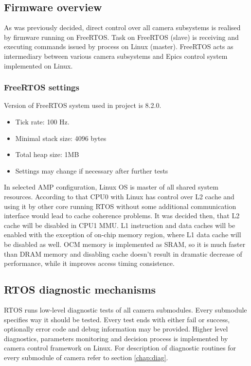 

\subsection{Firmware overview}
As was previously decided, direct control over all camera subsystems is realised by firmware running on FreeRTOS. Task on FreeRTOS (slave) is receiving and executing commands issued by process on Linux (master). FreeRTOS acts as intermediary between various camera subsystems and Epics control system implemented on Linux.

\subsubsection{FreeRTOS settings}
Version of FreeRTOS system used in project is 8.2.0. 

\begin{itemize}
\item Tick rate: 100 Hz.
\item Minimal stack size: 4096 bytes
\item Total heap size: 1MB
\item Settings may change if necessary after further tests
\end{itemize}

In selected AMP configuration, Linux OS is master of all shared system resources. According to that CPU0 with Linux has control over L2 cache and using it by other core running RTOS without some additional communication interface would lead to cache coherence problems. It was decided then, that L2 cache will be disabled in CPU1 MMU. L1 instruction and data caches will be enabled with the exception of on-chip memory region, where L1 data cache will be disabled as well. OCM memory is implemented as SRAM, so it is much faster than DRAM memory and disabling cache doesn't result in dramatic decrease of performance, while it improves access timing consistence.


\subsection{RTOS diagnostic mechanisms}
RTOS runs low-level diagnostic tests of all camera submodules. Every submodule specifies way it should be tested. Every test ends with either fail or success, optionally error code and debug information may be provided. Higher level diagnostics, parameters monitoring and decision process is implemented by camera control framework on Linux. For description of diagnostic routines for every submodule of camera refer to section \ref{chap:diag}.

